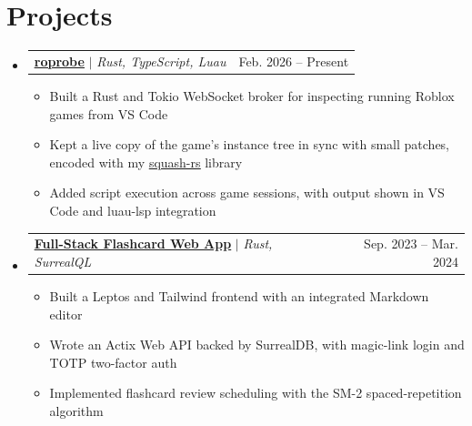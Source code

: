 \documentclass[a4paper,11pt]{article}
\makeatletter
\newcommand{\resumeItem}[1]{
  \item\small{
    {#1\vspace{-2pt}}%
  }%
}
\newcommand{\resumeProjectHeading}[2]{
    \item
    \begin{tabular*}{0.97\textwidth}{l@{\extracolsep{\fill}}r}
      \small#1 & #2 \\
    \end{tabular*}\vspace{-7pt}
}
\newcommand{\resumeSubHeadingListStart}{\begin{itemize}[leftmargin=0.15in, label={}]}
\newcommand{\resumeSubHeadingListEnd}{\end{itemize}}
\newcommand{\resumeItemListStart}{\begin{itemize}}
\newcommand{\resumeItemListEnd}{\end{itemize}\vspace{-5pt}}
\makeatother
\begin{document}
\section{Projects}
    \resumeSubHeadingListStart
      \resumeProjectHeading
          {\textbf{\href{https://github.com/Stefanuk12/roprobe}{\underline{roprobe}}} $|$ \emph{Rust, TypeScript, Luau}}{Feb. 2026 -- Present}
          \resumeItemListStart
            \resumeItem{Built a Rust and Tokio WebSocket broker for inspecting running Roblox games from VS Code}
            \resumeItem{Kept a live copy of the game's instance tree in sync with small patches, encoded with my \href{https://github.com/Stefanuk12/squash-rs}{\underline{squash-rs}} library}
            \resumeItem{Added script execution across game sessions, with output shown in VS Code and luau-lsp integration}
          \resumeItemListEnd
      \resumeProjectHeading
          {\textbf{\href{https://github.com/Stefanuk12/A-NEA}{\underline{Full-Stack Flashcard Web App}}} $|$ \emph{Rust, SurrealQL}}{Sep. 2023 -- Mar. 2024}
          \resumeItemListStart
            \resumeItem{Built a Leptos and Tailwind frontend with an integrated Markdown editor}
            \resumeItem{Wrote an Actix Web API backed by SurrealDB, with magic-link login and TOTP two-factor auth}
            \resumeItem{Implemented flashcard review scheduling with the SM-2 spaced-repetition algorithm}
          \resumeItemListEnd
    \resumeSubHeadingListEnd


\end{document}
